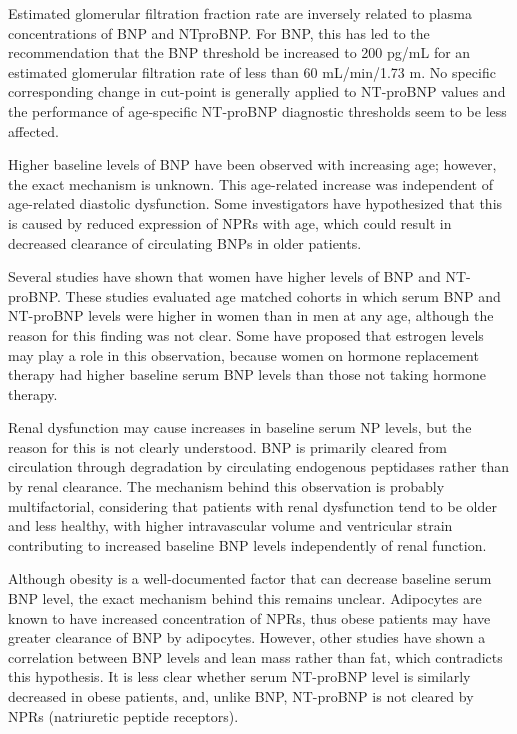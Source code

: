 \documentclass[14pt,a4paper,onecolumn]{extarticle}
\begin{document}
Estimated glomerular filtration fraction rate are inversely related to plasma concentrations of BNP and NTproBNP. For BNP, this has led to the recommendation that the BNP threshold be increased to 200 pg/mL for an estimated glomerular filtration rate of less than 60 mL/min/1.73 m. No specific corresponding change in cut-point is generally applied to NT-proBNP values and the performance of age-specific NT-proBNP diagnostic thresholds seem to be less affected. \citep{DeFilippi2008}

Higher baseline levels of BNP have been observed with increasing age; however, the exact mechanism is unknown. This age-related increase was independent of age-related diastolic dysfunction. Some investigators have hypothesized that this is caused by reduced expression of NPRs with age, which could result in decreased clearance of circulating BNPs in older patients. \citep{Maisel2018}

Several studies have shown that women have higher levels of BNP and NT-proBNP. These studies evaluated age matched cohorts in which serum BNP and NT-proBNP levels were higher in women than in men at any age, although the reason for this finding was not clear. Some have proposed that estrogen levels may play a role in this observation, because women on hormone replacement therapy had higher baseline serum BNP levels than those not taking hormone therapy. \citep{Maisel2018}

Renal dysfunction may cause increases in baseline serum NP levels, but the reason for this is not clearly understood. BNP is primarily cleared from circulation through degradation by circulating endogenous peptidases rather than by renal clearance. The mechanism behind this observation is probably multifactorial, considering that patients with renal dysfunction tend to be older and less healthy, with higher intravascular volume and ventricular strain contributing to increased baseline BNP levels independently of renal function. \citep{Maisel2018}

Although obesity is a well-documented factor that can decrease baseline serum BNP level, the exact mechanism behind this remains unclear.  Adipocytes are known to have increased concentration of NPRs, thus obese patients may have greater clearance of BNP by adipocytes. However, other studies have shown a correlation between BNP levels and lean mass rather than fat, which contradicts this hypothesis.  It is less clear whether serum NT-proBNP level is similarly decreased in obese patients, and, unlike BNP, NT-proBNP is not cleared by NPRs (natriuretic peptide receptors). \citep{Maisel2018}
\end{document}
